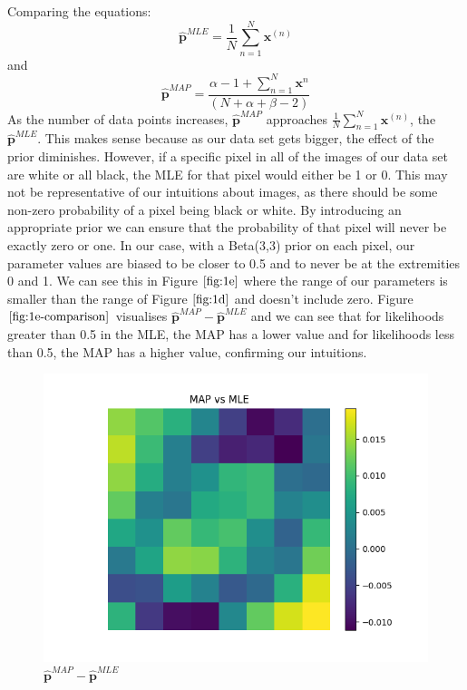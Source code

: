 \documentclass[12pt]{article}
\begin{document}
\begin{enumerate}
Comparing the equations:
    $$\hat{\textbf{p}}^{MLE} = \frac{1}{N}\sum_{n=1}^{N} \textbf{x}^{(n)}$$
    and
    $$\hat{\textbf{p}}^{MAP}  =  \frac{\alpha - 1 +\sum_{n=1}^{N} \textbf{x}^n}{(N+\alpha+\beta-2)}$$
As the number of data points increases, $\hat{\textbf{p}}^{MAP}$ approaches $\frac{1}{N}\sum_{n=1}^{N} \textbf{x}^{(n)}$, the $\hat{\textbf{p}}^{MLE}$.
This makes sense because as our data set gets bigger, the effect of the prior diminishes.
However, if a specific pixel in all of the images of our data set are white or all black, the MLE for that pixel would either be 1 or 0.
This may not be representative of our intuitions about images, as there should be some non-zero probability of a pixel being black or white.
By introducing an appropriate prior we can ensure that the probability of that pixel will never be exactly zero or one.
In our case, with a Beta(3,3) prior on each pixel, our parameter values are biased to be closer to 0.5 and to never be at the extremities 0 and 1.
We can see this in Figure $\ref{fig:1e}$ where the range of our parameters is smaller than the range of Figure $\ref{fig:1d}$ and doesn't include zero.
Figure $\ref{fig:1e-comparison}$ visualises $\hat{\textbf{p}}^{MAP}-\hat{\textbf{p}}^{MLE}$ and we can see that for likelihoods greater than 0.5 in the MLE, the MAP has a lower value and for likelihoods less than 0.5, the MAP has a higher value, confirming our intuitions.

  \begin{figure}[h]
  \centering
  \includegraphics[scale=0.4]{outputs/q1/q1e-mle-vs-map}
  \caption{$\hat{\textbf{p}}^{MAP}-\hat{\textbf{p}}^{MLE}$}
  \label{fig:1e-comparison}
  \end{figure}


\end{enumerate}
\end{document}
